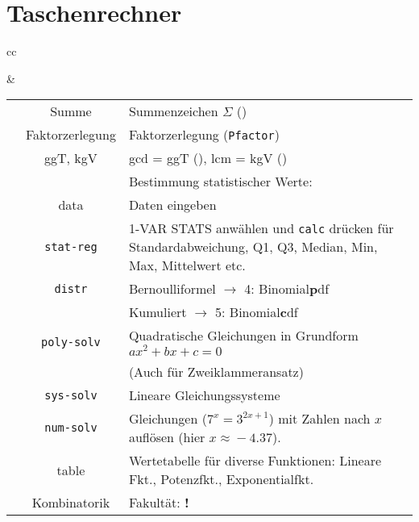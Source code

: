 \section*{Taschenrechner}

\begin{tabular}{cc}


&

\begin{tabular}{c|c|p{80mm}}\hline
\tiprobutton{math}         &Summe             & Summenzeichen $\Sigma$ (\tiprobutton{5})\\
                           &Faktorzerlegung   & Faktorzerlegung (\tiprobutton{4}\texttt{Pfactor})\\
                           & ggT, kgV         & gcd = ggT
(\tiprobutton{3}), lcm = kgV (\tiprobutton{2})\\\hline
                           &                  & Bestimmung statistischer Werte:\\
\tiprobutton{data}         & data             & Daten eingeben\\
                           &\texttt{stat-reg} & 1-VAR STATS anwählen
und \texttt{calc} drücken für Standardabweichung, Q1, Q3, Median, Min,
Max, Mittelwert etc.\\
                           &\texttt{distr}    & Bernoulliformel $\rightarrow$ 4: Binomial\textbf{p}df\\
                           &                  & Kumuliert $\rightarrow$ 5: Binomial\textbf{c}df\\\hline
\tiprobutton{cos_poly-solv}&\texttt{poly-solv}&  Quadratische Gleichungen in Grundform $ax^2+bx+c=0$\\
                           &                  &  (Auch für Zweiklammeransatz)\\\hline
\tiprobutton{tan_sys-solv} &\texttt{sys-solv} &  Lineare Gleichungssysteme\\\hline
\tiprobutton{sin_num-solv} &\texttt{num-solv} &  Gleichungen ($7^x=3^{2x+1}$) mit Zahlen nach $x$ auf\/lösen (hier $x\approx{}-4.37$).\\\hline
\tiprobutton{table}        & table            &  Wertetabelle für diverse Funktionen: Lineare Fkt., Potenzfkt., Exponentialfkt.\\\hline
\tiprobutton{ncrnpr}       &Kombinatorik      &  Fakultät: {\color{red}\textbf{!}}\\

\end{tabular}
\end{tabular}
